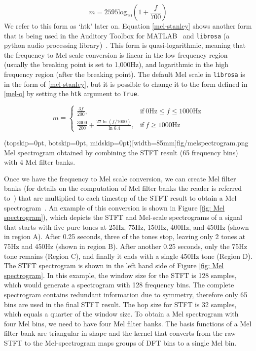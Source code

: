 \documentclass{ieeeaccess}
\newcommand{\nbh}[1]{\texttt{#1}}
\begin{document}
\begin{equation}
m=2595 \text{log}_{10}\left(1+\frac{f}{700} \right)
\label{mel-o}
\end{equation}
We refer to this form as `htk' later on. Equation \eqref{mel-stanley} shows another form that is being used in the Auditory Toolbox for MATLAB~\cite{slaney1998matlab} and \nbh{librosa} (a python audio processing library)~\cite{mcfee2015Librosa}. This form is quasi-logarithmic, meaning that the frequency to Mel scale conversion is linear in the low frequency region (usually the breaking point is set to 1,000Hz), and logarithmic in the high frequency region (after the breaking point). The default Mel scale in \nbh{librosa} is in the form of \eqref{mel-stanley}, but it is possible to change it to the form defined in \eqref{mel-o} by setting the \nbh{htk} argument to \nbh{True}.

\begin{equation}
    m=
    \begin{cases}
      \frac{3f}{200}, & \text{if}\ 0 \text{Hz} \leq f\leq1000 \text{Hz} \\
      \frac{3000}{200} + \frac{27\ln{(f/1000)}}{\ln{6.4}}, & \text{if}\ f \ge 1000\text{Hz}
    \end{cases}
    \label{mel-stanley}
\end{equation}

\Figure[t](topskip=0pt, botskip=0pt, midskip=0pt)[width=85mm]{fig/melspectrogram.png}
{Mel spectrogram obtained by combining the STFT result (65 frequency bins) with 4 Mel filter banks. \label{fig: Mel spectrogram}}


Once we have the frequency to Mel scale conversion, we can create Mel filter banks (for details on the computation of Mel filter banks the reader is referred to~\cite{Davis1980ComparisonOP}) that are multiplied to each timestep of the STFT result to obtain a Mel spectrogram~\cite{rabiner2011theory}. An example of this conversion is shown in  Figure \ref{fig: Mel spectrogram}), which depicts the STFT and Mel-scale spectrograms of a signal that starts with five pure tones at 25Hz, 75Hz, 150Hz, 400Hz, and 450Hz (shown in region A). After 0.25 seconds, three of the tones stop, leaving only 2 tones at 75Hz and 450Hz (shown in region B). After another 0.25 seconds, only the 75Hz tone remains (Region C), and finally it ends with a single 450Hz tone (Region D). The STFT spectrogram is shown in the left hand side of Figure \ref{fig: Mel spectrogram}. In this example, the window size for the STFT is 128 samples, which would generate a spectrogram with 128 frequency bins. The complete spectrogram contains redundant information due to symmetry, therefore only 65 bins are used in the final STFT result. The hop size for STFT is 32 samples, which equals a quarter of the window size. To obtain a Mel spectrogram with four Mel bins, we need to have four Mel filter banks. The basis functions of a Mel filter bank are triangular in shape and the kernel that converts from the raw STFT to the Mel-spectrogram maps groups of DFT bins to a single Mel bin. %
\end{document}
